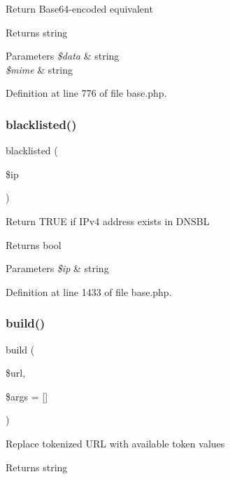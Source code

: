 Return Base64-\/encoded equivalent \begin{DoxyReturn}{Returns}
string 
\end{DoxyReturn}

\begin{DoxyParams}{Parameters}
{\em \$data} & string \\
\hline
{\em \$mime} & string \\
\hline
\end{DoxyParams}


Definition at line 776 of file base.\+php.

\hypertarget{class_base_a3e27c86c02a50a6906d9d92337d7437d}{}\label{class_base_a3e27c86c02a50a6906d9d92337d7437d} 
\subsubsection{\texorpdfstring{blacklisted()}{blacklisted()}}
{\footnotesize\ttfamily blacklisted (\begin{DoxyParamCaption}\item[{}]{\$ip }\end{DoxyParamCaption})}

Return T\+R\+UE if I\+Pv4 address exists in D\+N\+S\+BL \begin{DoxyReturn}{Returns}
bool 
\end{DoxyReturn}

\begin{DoxyParams}{Parameters}
{\em \$ip} & string \\
\hline
\end{DoxyParams}


Definition at line 1433 of file base.\+php.

\hypertarget{class_base_a9f2a5290b60008d473e1c9e38f1465d0}{}\label{class_base_a9f2a5290b60008d473e1c9e38f1465d0} 
\subsubsection{\texorpdfstring{build()}{build()}}
{\footnotesize\ttfamily build (\begin{DoxyParamCaption}\item[{}]{\$url,  }\item[{}]{\$args = {\ttfamily \mbox{[}\mbox{]}} }\end{DoxyParamCaption})}

Replace tokenized U\+RL with available token values \begin{DoxyReturn}{Returns}
string 
\end{DoxyReturn}

